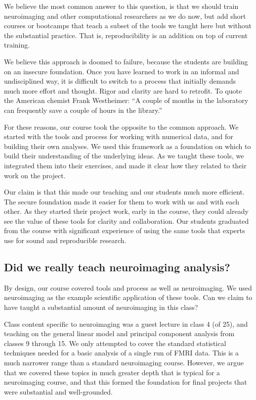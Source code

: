We believe the most common answer to this question, is that we should train
neuroimaging and other computational researchers as we do now, but add short
courses or bootcamps that teach a subset of the tools we taught here but without
the substantial practice.
That is, reproducibility is an addition on top of current training.

We believe this approach is doomed to failure, because the students are
building on an insecure foundation.  Once you have learned to work in an
informal and undisciplined way, it is difficult to switch to a process that
initially demands much more effort and thought.  Rigor and clarity are hard to
retrofit.
To quote the American chemist Frank Westheimer:
``A couple of months in the laboratory can frequently save a couple of hours in the library.''

For these reasons, our course took the opposite to the common approach. We
started with the tools and process for working with numerical data, and for
building their own analyses. We used this framework as a foundation on which
to build their understanding of the underlying ideas.  As we taught these
tools, we integrated them into their exercises, and made it clear how they
related to their work on the project.

Our claim is that this made our teaching and our students much more efficient.
The secure foundation made it easier for them to work with us and with each
other. As they started their project work, early in the course, they could
already see the value of these tools for clarity and collaboration. Our
students graduated from the course with significant experience of using the
same tools that experts use for sound and reproducible research.

\subsection{Did we really teach neuroimaging analysis?}

By design, our course covered tools and process as well as neuroimaging.  We
used neuroimaging as the example scientific application of these tools.  Can
we claim to have taught a substantial amount of neuroimaging in this class?

Class content specific to neuroimaging was a guest lecture in class 4 (of 25),
and teaching on the general linear model and principal component analysis from
classes 9 through 15.  We only attempted to cover the standard statistical
techniques needed for a basic analysis of a single run of FMRI data.  This is
a much narrower range than a standard neuroimaging course.  However, we argue
that we covered these topics in much greater depth that is typical for a
neuroimaging course, and that this formed the foundation for final projects
that were substantial and well-grounded.

